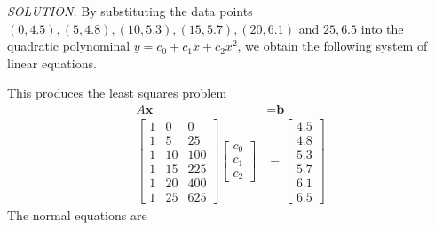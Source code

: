 \documentclass{article}
\newcommand\B{\textbf}
\newcommand\T{\textit}
\begin{document}
    \T{\textcolor{blue5}{SOLUTION.}} By substituting the data points $(0, 4.5), (5,4.8), (10, 5.3),
    (15, 5.7), (20, 6.1)$ and $25, 6.5$ into the quadratic polynominal $y = c_0 + c_1x + c_2x^2$, we obtain 
    the following system of linear equations.
    \begin{center}
    \end{center}
    This produces the least squares problem
    \begin{equation*}
        \begin{split}
            A\B{x} & = \B{b} \\
            \begin{bmatrix}
                1 & 0 & 0 \\
                1 & 5 & 25 \\
                1 & 10 & 100 \\
                1 & 15 & 225 \\
                1 & 20 & 400 \\
                1 & 25 & 625
            \end{bmatrix}
            \begin{bmatrix}
                c_0 \\
                c_1 \\
                c_2
            \end{bmatrix} &=
            \begin{bmatrix}
                4.5 \\
                4.8 \\
                5.3 \\
                5.7 \\
                6.1 \\
                6.5
            \end{bmatrix}
        \end{split}
    \end{equation*}
    The normal equations are
\end{document}
